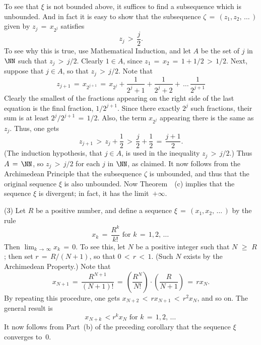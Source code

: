         To see that ${\xi}$ is not bounded above, it suffices to find a subsequence which is unbounded.
    And in fact it is easy to show that the subsequence ${\zeta} \,=\, (z_{1},z_{2},\,{\ldots}\,)$ given by $z_{j} \,=\, x_{2^{j}}$ satisfies
        \begin{displaymath}
        z_{j}\,>\,\frac{j}{2}.
        \end{displaymath}
    To see why this is true, use Mathematical Induction, and let $A$ be the set of $j$ in ${\NN}$ such that $z_{j}\,>\,j/2$.
    Clearly $1{\in}A$, since $z_{1} \,=\, x_{2} \,=\, 1+1/2\,>\,1/2$.
    Next, suppose that $j{\in}A$, so that $z_{j}\,>\,j/2$.
    Note that
        \begin{displaymath}
        z_{j+1} \,=\, x_{2^{j+1}} \,=\, x_{2^{j}} + \frac{1}{2^{j}+1} + \frac{1}{2^{j}+2} + \,{\ldots}\, \frac{1}{2^{j+1}}
        \end{displaymath}
    Clearly the smallest of the fractions appearing on the right side of the last equation is the final fraction, $1/2^{j+1}$.
    Since there exactly $2^{j}$ such fractions, their sum is at least $2^{j}/2^{j+1} \,=\, 1/2$. Also, the term $x_{2^{j}}$ appearing there is the same as $z_{j}$.
    Thus, one gets
        \begin{displaymath}
        z_{j+1}\,>\,z_{j}+\frac{1}{2}\,>\,\frac{j}{2}+\frac{1}{2} \,=\, \frac{j+1}{2}.
        \end{displaymath}
    (The induction hypothesis, that $j{\in}A$, is used in the inequality $z_{j}\,>\,j/2$.)
    Thus $A \,=\, {\NN}$, so $z_{j}\,>\,j/2$ for each $j$ in ${\NN}$, as claimed.
    It now follows from the Archimedean Principle that the subsequence ${\zeta}$ is unbounded, and thus that the original sequence ${\xi}$ is also unbounded.
    Now Theorem~~(c) implies that the sequence ${\xi}$ is divergent; in fact, it has the limit~$+{\infty}$.

\V


        (3) Let $R$ be a positive number, and define a sequence ${\xi} \,=\, (x_{1},x_{2},\,{\ldots}\,)$ by the rule
        \begin{displaymath}
        x_{k} \,=\, \frac{R^{k}}{k!} \mbox{ for } k \,=\, 1,2,\,{\ldots}\,
        \end{displaymath}
    Then $\lim_{k \,{\rightarrow}\, {\infty}} x_{k} \,=\, 0$. To see this, let $N$ be a positive integer such that $N\,\,{\geq}\,\,R$; then set $r \,=\, R/(N+1)$, so that $0\,<\,r\,<\,1$.
    (Such $N$ exists by the Archimedean Property.) Note that
        \begin{displaymath}
        x_{N+1} \,=\, \frac{R^{N+1}}{(N+1)!} \,=\, \left(\frac{R^{N}}{N!}\right){\cdot}\left(\frac{R}{N+1}\right) \,=\, rx_{N}.
        \end{displaymath}
    By repeating this procedure, one gets $x_{N+2}\,<\,rx_{N+1}\,<\,r^{2}x_{N}$, and so on. The general result is
        \begin{displaymath}
        x_{N+k}\,< r^{k}x_{N} \mbox{ for $k \,=\, 1,2,\,{\ldots}\,$}
        \end{displaymath}
    It now follows from Part~(b) of the preceding corollary that the sequence ${\xi}$ converges to~$0$.

